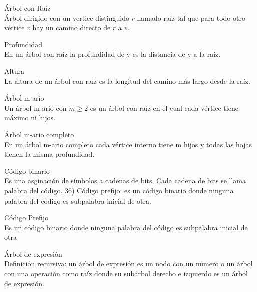 \documentclass{article}
\begin{document}
\begin{defn}
Árbol con Raíz \\ Árbol dirigido con un vertice distinguido $r$ llamado raíz tal que para todo otro vértice $v$ hay un camino directo de $r$ a $v$.
\end{defn}

\begin{defn}
Profundidad \\ En un árbol con raíz la profundidad de y es la distancia de y a la raíz.
\end{defn}

\begin{defn}
Altura \\ La altura de un árbol con raíz es la longitud del camino más largo desde la raíz.
\end{defn}

\begin{defn}
Árbol m-ario \\ Un árbol m-ario con $m\geq2$ es un árbol con raíz en el cual cada vértice tiene máximo ni hijos. 
\end{defn}

\begin{defn}
Árbol m-ario completo \\ En un árbol m-ario completo cada vértice interno tiene m hijos y todas las hojas tienen la misma profundidad.
\end{defn}

\begin{defn}
Código binario \\ Es una asginación de símbolos a cadenas de bits. Cada cadena de bits se llama palabra del código. 36) Código prefijo: es un código binario donde ninguna palabra del código es subpalabra inicial de otra.
\end{defn}
\begin{defn}
Código Prefijo \\ Es un código binario donde ninguna palabra del código es subpalabra inicial de otra
\end{defn}
\begin{defn}
Árbol de expresión \\Definición recursiva: un árbol de expresión es un nodo con un número o un árbol con una operación como raíz donde su subárbol derecho e izquierdo es un árbol de expresión.
\end{defn}
\end{document}
